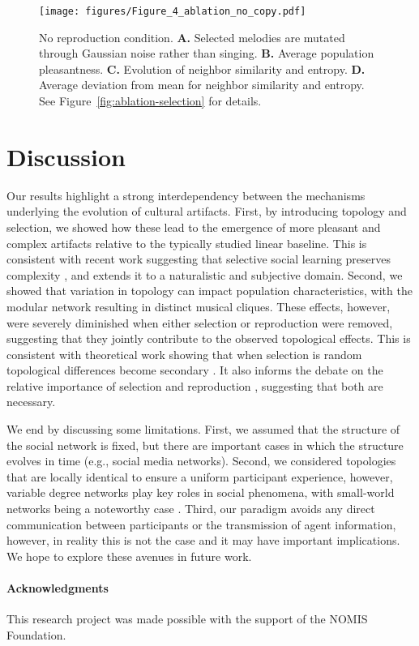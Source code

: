 \documentclass[10pt,letterpaper]{article}
\begin{document}
\begin{figure}[t]
\begin{center}
\texttt{[image: figures/Figure\_4\_ablation\_no\_copy.pdf]}
\end{center}
\caption{No reproduction condition. \textbf{A.} Selected melodies are mutated through Gaussian noise rather than singing. \textbf{B.} Average population pleasantness. \textbf{C.} Evolution of neighbor similarity and entropy. \textbf{D.} Average deviation from mean for neighbor similarity and entropy. See Figure~\ref{fig:ablation-selection} for details.}
\label{fig:ablation-reproduction}
\end{figure}

\section{Discussion}
Our results highlight a strong interdependency between the mechanisms underlying the evolution of cultural artifacts. First, by introducing topology and selection, we showed how these lead to the emergence of more pleasant and complex artifacts relative to the typically studied linear baseline. This is consistent with recent work suggesting that selective social learning preserves complexity \cite{thompson2022complex}, and extends it to a naturalistic and subjective domain. Second, we showed that variation in topology can impact population characteristics, with the modular network resulting in distinct musical cliques. These effects, however, were severely diminished when either selection or reproduction were removed, suggesting that they jointly contribute to the observed topological effects. This is consistent with theoretical work showing that when selection is random topological differences become secondary \cite{whalen2017adding}. It also informs the debate on the relative importance of selection and reproduction \cite{mesoudi2021cultural}, suggesting that both are necessary.

We end by discussing some limitations. First, we assumed that the structure of the social network is fixed, but there are important cases in which the structure evolves in time (e.g., social media networks). Second, we considered topologies that are locally identical to ensure a uniform participant experience, however, variable degree networks play key roles in social phenomena, with small-world networks being a noteworthy case \cite{watts1998collective}. Third, our paradigm avoids any direct communication between participants or the transmission of agent information, however, in reality this is not the case and it may have important implications. We hope to explore these avenues in future work. 
  
\paragraph{Acknowledgments}
This research project was made possible with the support of the NOMIS Foundation.



\setlength{\bibleftmargin}{.125in}
\setlength{\bibindent}{-\bibleftmargin}


\end{document}

